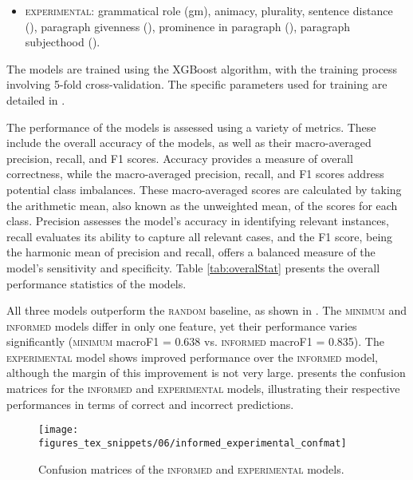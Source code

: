 \begin{itemize}
	\item \textsc{experimental:} grammatical role (gm), animacy, plurality, sentence distance (), paragraph givenness (), prominence in paragraph (), paragraph subjecthood ().
\end{itemize}


The models are trained using the XGBoost algorithm, with the training process involving 5-fold cross-validation. The specific parameters used for training are detailed in .

The performance of the models is assessed using a variety of metrics. These include the overall accuracy of the models, as well as their macro-averaged precision, recall, and F1 scores. Accuracy provides a measure of overall correctness, while the macro-averaged precision, recall, and F1 scores address potential class imbalances. These macro-averaged scores are calculated by taking the arithmetic mean, also known as the unweighted mean, of the scores for each class. Precision assesses the model's accuracy in identifying relevant instances, recall evaluates its ability to capture all relevant cases, and the F1 score, being the harmonic mean of precision and recall, offers a balanced measure of the model's sensitivity and specificity. Table \ref{tab:overalStat} presents the overall performance statistics of the models.

{\renewcommand\normalsize{\footnotesize}%
	\normalsize
	}


All three models outperform the \textsc{random} baseline, as shown in . The \textsc{minimum} and \textsc{informed} models differ in only one feature, yet their performance varies significantly (\textsc{minimum} macroF1 = 0.638 vs. \textsc{informed} macroF1 = 0.835). The \textsc{experimental} model shows improved performance over the \textsc{informed} model, although the margin of this improvement is not very large.  presents the confusion matrices for the \textsc{informed} and \textsc{experimental} models, illustrating their respective performances in terms of correct and incorrect predictions. 

\begin{figure}
	\centering
	\texttt{[image: figures\_tex\_snippets/06/informed\_experimental\_confmat]}
	\caption{Confusion matrices of the \textsc{informed} and \textsc{experimental} models.}
	\label{fig:informedexperimentaconfmat}
\end{figure}

